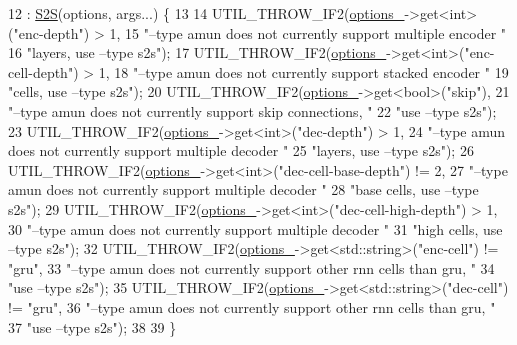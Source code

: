 \begin{DoxyCode}
12                                           : \hyperlink{namespacemarian_a83eeb152f60aff415a60e0bde62fcb85}{S2S}(options, args...) \{
13 
14     UTIL\_THROW\_IF2(\hyperlink{classmarian_1_1EncoderDecoder_a467e7d547bd7888d1bea248e99cef212}{options\_}->get<\textcolor{keywordtype}{int}>(\textcolor{stringliteral}{"enc-depth"}) > 1,
15                    \textcolor{stringliteral}{"--type amun does not currently support multiple encoder "}
16                    \textcolor{stringliteral}{"layers, use --type s2s"});
17     UTIL\_THROW\_IF2(\hyperlink{classmarian_1_1EncoderDecoder_a467e7d547bd7888d1bea248e99cef212}{options\_}->get<\textcolor{keywordtype}{int}>(\textcolor{stringliteral}{"enc-cell-depth"}) > 1,
18                    \textcolor{stringliteral}{"--type amun does not currently support stacked encoder "}
19                    \textcolor{stringliteral}{"cells, use --type s2s"});
20     UTIL\_THROW\_IF2(\hyperlink{classmarian_1_1EncoderDecoder_a467e7d547bd7888d1bea248e99cef212}{options\_}->get<\textcolor{keywordtype}{bool}>(\textcolor{stringliteral}{"skip"}),
21                    \textcolor{stringliteral}{"--type amun does not currently support skip connections, "}
22                    \textcolor{stringliteral}{"use --type s2s"});
23     UTIL\_THROW\_IF2(\hyperlink{classmarian_1_1EncoderDecoder_a467e7d547bd7888d1bea248e99cef212}{options\_}->get<\textcolor{keywordtype}{int}>(\textcolor{stringliteral}{"dec-depth"}) > 1,
24                    \textcolor{stringliteral}{"--type amun does not currently support multiple decoder "}
25                    \textcolor{stringliteral}{"layers, use --type s2s"});
26     UTIL\_THROW\_IF2(\hyperlink{classmarian_1_1EncoderDecoder_a467e7d547bd7888d1bea248e99cef212}{options\_}->get<\textcolor{keywordtype}{int}>(\textcolor{stringliteral}{"dec-cell-base-depth"}) != 2,
27                    \textcolor{stringliteral}{"--type amun does not currently support multiple decoder "}
28                    \textcolor{stringliteral}{"base cells, use --type s2s"});
29     UTIL\_THROW\_IF2(\hyperlink{classmarian_1_1EncoderDecoder_a467e7d547bd7888d1bea248e99cef212}{options\_}->get<\textcolor{keywordtype}{int}>(\textcolor{stringliteral}{"dec-cell-high-depth"}) > 1,
30                    \textcolor{stringliteral}{"--type amun does not currently support multiple decoder "}
31                    \textcolor{stringliteral}{"high cells, use --type s2s"});
32     UTIL\_THROW\_IF2(\hyperlink{classmarian_1_1EncoderDecoder_a467e7d547bd7888d1bea248e99cef212}{options\_}->get<std::string>(\textcolor{stringliteral}{"enc-cell"}) != \textcolor{stringliteral}{"gru"},
33                    \textcolor{stringliteral}{"--type amun does not currently support other rnn cells than gru, "}
34                    \textcolor{stringliteral}{"use --type s2s"});
35     UTIL\_THROW\_IF2(\hyperlink{classmarian_1_1EncoderDecoder_a467e7d547bd7888d1bea248e99cef212}{options\_}->get<std::string>(\textcolor{stringliteral}{"dec-cell"}) != \textcolor{stringliteral}{"gru"},
36                    \textcolor{stringliteral}{"--type amun does not currently support other rnn cells than gru, "}
37                    \textcolor{stringliteral}{"use --type s2s"});
38 
39   \}
\end{DoxyCode}


